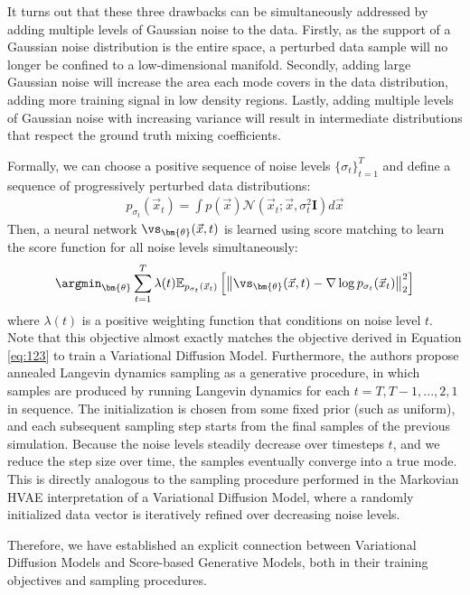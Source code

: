 It turns out that these three drawbacks can be simultaneously addressed by adding multiple levels of Gaussian noise to the data.  Firstly, as the support of a Gaussian noise distribution is the entire space, a perturbed data sample will no longer be confined to a low-dimensional manifold.  Secondly, adding large Gaussian noise will increase the area each mode covers in the data distribution, adding more training signal in low density regions.  Lastly, adding multiple levels of Gaussian noise with increasing variance will result in intermediate distributions that respect the ground truth mixing coefficients.

\newpage
Formally, we can choose a positive sequence of noise levels $\{\sigma_t\}_{t=1}^T$ and define a sequence of progressively perturbed data distributions:
\begin{align}
p_{\sigma_t}(\vec{x}_t) = \int p(\vec{x})\mathcal{N}(\vec{x}_t; \vec{x}, \sigma_t^2\textbf{I})d\vec{x}
\end{align}
Then, a neural network $\vs_{\bm{\theta}}(\vec{x}, t)$ is learned using score matching to learn the score function for all noise levels simultaneously:
\begin{align}
\argmin_{\bm{\theta}} \sum_{t=1}^T\lambda(t)\mathbb{E}_{p_{\sigma_t}(\vec{x}_t)}\left[\left\lVert \vs_{\bm{\theta}}(\vec{x}, t) - \nabla\log p_{\sigma_t}(\vec{x}_t)\right\rVert_2^2\right]
\end{align}
where $\lambda(t)$ is a positive weighting function that conditions on noise level $t$.  Note that this objective almost exactly matches the objective derived in Equation \ref{eq:123} to train a Variational Diffusion Model.  Furthermore, the authors propose annealed Langevin dynamics sampling as a generative procedure, in which samples are produced by running Langevin dynamics for each $t = T, T-1, ..., 2, 1$ in sequence.  The initialization is chosen from some fixed prior (such as uniform), and each subsequent sampling step starts from the final samples of the previous simulation.  Because the noise levels steadily decrease over timesteps $t$, and we reduce the step size over time, the samples eventually converge into a true mode.  This is directly analogous to the sampling procedure performed in the Markovian HVAE interpretation of a Variational Diffusion Model, where a randomly initialized data vector is iteratively refined over decreasing noise levels.

Therefore, we have established an explicit connection between Variational Diffusion Models and Score-based Generative Models, both in their training objectives and sampling procedures.

